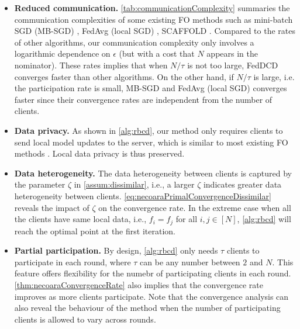 \begin{itemize}
    \item \textbf{Reduced communication.} 
    \autoref{tab:communicationComplexity} summaries the communication complexities of some existing FO methods such as mini-batch SGD (MB-SGD) \citep{WoodworthPS20}, FedAvg (local SGD) \citep{mcmahan2017communication}, SCAFFOLD \citep{pmlr-v119-karimireddy20a}. Compared to the rates of other algorithms, our communication complexity only involves a logarithmic dependence on $\epsilon$ (but with a cost that $N$ appears in the nominator). These rates implies that when $N/\tau$ is not too large, FedDCD converges faster than other algorithms.
    On the other hand, if $N/\tau$ is large, i.e. the participation rate is small, MB-SGD and FedAvg (local SGD) converges faster since their convergence rates are independent from the number of clients. 
    \item \textbf{Data privacy.} As shown in \autoref{alg:rbcd}, our method only requires clients to send local model updates to the server, which is similar to most existing FO methods \citep{mcmahan2017communication,li2018federated,yuan2021federated,karimireddy2020mime}. Local data privacy is thus preserved. 
    \item \textbf{Data heterogeneity.} 
    The data heterogeneity between clients is captured by the parameter $\zeta$ in \autoref{assum:dissimilar}, i.e., a larger $\zeta$ indicates greater data heterogeneity between clients. \autoref{eq:necoaraPrimalConvergenceDissimilar} reveals the impact of $\zeta$ on the convergence rate. In the extreme case when all the clients have same local data, i.e., $f_i = f_j$ for all $i,j \in [N]$, \autoref{alg:rbcd} will reach the optimal point at the first iteration.
    \item \textbf{Partial participation.} By design, \autoref{alg:rbcd} only needs $\tau$ clients to participate in each round, where $\tau$ can be any number between $2$ and $N$. This feature offers flexibility for the numebr of participating clients in each round. \autoref{thm:necoaraConvergenceRate} also implies that the convergence rate improves as more clients participate. Note that the convergence analysis can also reveal the behaviour of the method when the number of participating clients is allowed to vary across rounds.
\end{itemize}

